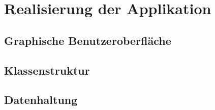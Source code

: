 \chapter{Realisierung der Applikation}

\section{Graphische Benutzeroberfläche}

\section{Klassenstruktur}

\section{Datenhaltung}
